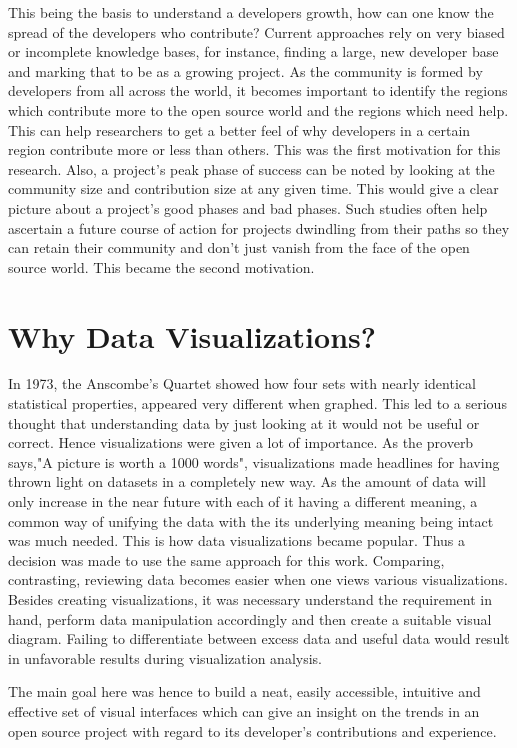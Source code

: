 \documentclass[seploa]{beavtex}
\begin{document}
This being the basis to understand a developers growth, how can one know the spread of the developers who contribute? Current approaches rely on very biased or incomplete knowledge bases, for instance, finding a large, new developer base and marking that to be as a growing project\cite{igor2014}. As the community is formed by developers from all across the world, it becomes important to identify the regions which contribute more to the open source world and the regions which need help. This can help researchers to get a better feel of why developers in a certain region contribute more or less than others. This was the first motivation for this research. Also, a project's peak phase of success can be noted by looking at the community size and contribution size at any given time. This would give a clear picture about a project's good phases and bad phases. Such studies often help ascertain a future course of action for projects dwindling from their paths so they can retain their community and don't just vanish from the face of the open source world. This became the second motivation.

\section{Why Data Visualizations?}
In 1973, the Anscombe's Quartet showed how four sets with nearly identical statistical properties, appeared very different when graphed\cite{wiki}. This led to a serious thought that understanding data by just looking at it would not be useful or correct. Hence visualizations were given a lot of importance. As the proverb says,"A picture is worth a 1000 words", visualizations made headlines for having thrown light on datasets in a completely new way. As the amount of data will only increase in the near future with each of it having a different meaning, a common way of unifying the data with the its underlying meaning being intact was much needed. This is how data visualizations became popular. Thus a decision was made to use the same approach for this work. Comparing, contrasting, reviewing data becomes easier when one views various visualizations. Besides creating visualizations, it was necessary understand the requirement in hand, perform data manipulation accordingly and then create a suitable visual diagram. Failing to differentiate between excess data and useful data would result in unfavorable results during visualization analysis.

The main goal here was hence to build a neat, easily accessible, intuitive and effective set of visual interfaces which can give an insight on the trends in an open source project with regard to its developer's contributions and experience.
\end{document}
